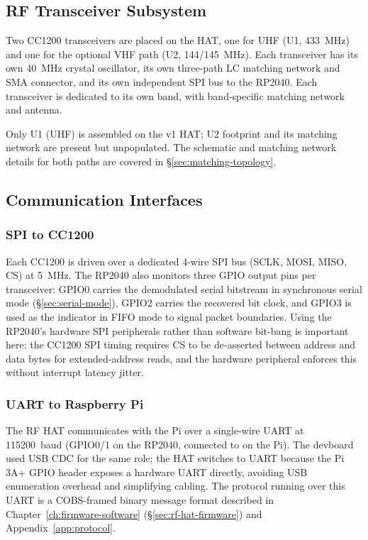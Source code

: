 \subsection{RF Transceiver Subsystem}

Two CC1200 transceivers are placed on the HAT, one for UHF (U1, 433~MHz) and one for the optional VHF path (U2, 144/145~MHz). Each transceiver has its own 40~MHz crystal oscillator, its own three-path LC matching network and SMA connector, and its own independent SPI bus to the RP2040. Each transceiver is dedicated to its own band, with band-specific matching network and antenna.

Only U1 (UHF) is assembled on the v1 HAT; U2 footprint and its matching network are present but unpopulated. The schematic and matching network details for both paths are covered in \S\ref{sec:matching-topology}.

\subsection{Communication Interfaces}

\subsubsection{SPI to CC1200}

Each CC1200 is driven over a dedicated 4-wire SPI bus (SCLK, MOSI, MISO, CS) at 5~MHz. The RP2040 also monitors three GPIO output pins per transceiver: GPIO0 carries the demodulated serial bitstream in synchronous serial mode (\S\ref{sec:serial-mode}), GPIO2 carries the recovered bit clock, and GPIO3 is used as the  indicator in FIFO mode to signal packet boundaries. Using the RP2040's hardware SPI peripherals rather than software bit-bang is important here: the CC1200 SPI timing requires CS to be de-asserted between address and data bytes for extended-address reads, and the hardware peripheral enforces this without interrupt latency jitter.

\subsubsection{UART to Raspberry Pi}

The RF HAT communicates with the Pi over a single-wire UART at 115200~baud (GPIO0/1 on the RP2040, connected to  on the Pi). The devboard used USB CDC for the same role; the HAT switches to UART because the Pi 3A+ GPIO header exposes a hardware UART directly, avoiding USB enumeration overhead and simplifying cabling. The protocol running over this UART is a COBS-framed binary message format described in Chapter~\ref{ch:firmware-software} (\S\ref{sec:rf-hat-firmware}) and Appendix~\ref{app:protocol}.

